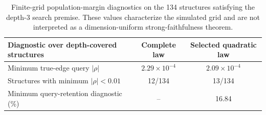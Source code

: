 \begin{table}[t]
\centering
\small
\renewcommand{\arraystretch}{1.13}
\setlength{\tabcolsep}{5pt}
\begin{tabularx}{\textwidth}{@{}L{1.55}C{0.72}C{0.73}@{}}
\toprule
Diagnostic over depth-covered structures & Complete law & Selected quadratic law \\
\midrule
Minimum true-edge query $|\rho|$ & $2.29\times10^{-4}$ & $2.09\times10^{-4}$ \\
Structures with minimum $|\rho|<0.01$ & 12/134 & 13/134 \\
Minimum query-retention diagnostic (\%) & -- & 16.84 \\
\bottomrule
\end{tabularx}
\caption{Finite-grid population-margin diagnostics on the 134 structures satisfying the depth-$3$ search premise. These values characterize the simulated grid and are not interpreted as a dimension-uniform strong-faithfulness theorem.}
\label{tab:margin-boundary}
\end{table}
